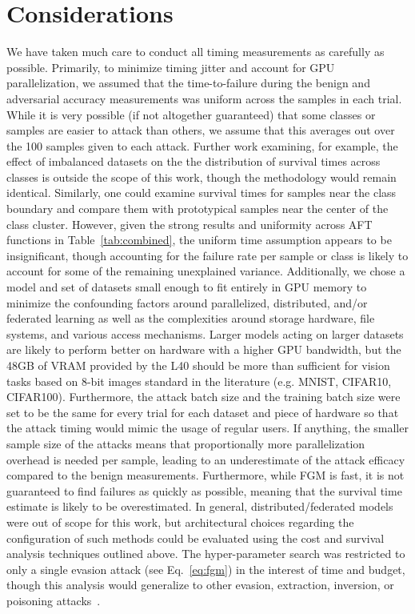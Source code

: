 \documentclass[conference]{IEEEtran}
\begin{document}
{\section{Considerations}
\label{considerations}

We have taken much care to conduct all timing measurements as carefully as possible.
Primarily, to minimize timing jitter and account for GPU parallelization, we assumed that the time-to-failure during the benign and adversarial accuracy measurements was uniform across the samples in each trial. 
While it is very possible (if not altogether guaranteed) that some classes or samples are easier to attack than others, we assume that this averages out over the 100 samples given to each attack. Further work examining, for example, the effect of imbalanced datasets on the the distribution of survival times across classes is outside the scope of this work, though the methodology would remain identical. Similarly, one could examine survival times for samples near the class boundary and compare them with prototypical samples near the center of the class cluster. 
However, given the strong results and uniformity across AFT functions in Table~\ref{tab:combined}, the uniform time assumption appears to be insignificant, though accounting for the failure rate per sample or class is likely to account for some of the remaining unexplained variance. 
Additionally, we chose a model and set of datasets small enough to fit entirely in GPU memory to minimize the confounding factors around parallelized, distributed, and/or federated learning as well as the complexities around storage hardware, file systems, and various access mechanisms. 
Larger models acting on larger datasets are likely to perform better on hardware with a higher GPU bandwidth, but the 48GB of VRAM provided by the L40 should be more than sufficient for vision tasks based on 8-bit images standard in the literature (e.g. MNIST, CIFAR10, CIFAR100). Furthermore, the attack batch size and the training batch size were set to be the same for every trial for each dataset and piece of hardware so that the attack timing would mimic the usage of regular users.
If anything, the smaller sample size of the attacks means that proportionally more parallelization overhead is needed per sample, leading to an underestimate of the attack efficacy compared to the benign measurements. Furthermore, while FGM is fast, it is not guaranteed to find failures as quickly as possible, meaning that the survival time estimate is likely to be overestimated.
In general, distributed/federated models were out of scope for this work, but architectural choices regarding the configuration of such methods could be evaluated using the cost and survival analysis techniques outlined above. 
The hyper-parameter search was restricted to only a single evasion attack (see Eq.~\ref{eq:fgm}) in the interest of time and budget, though this analysis would generalize to other evasion, extraction, inversion, or poisoning attacks~\cite{biggio_evasion_2013,biggio_poisoning_2013,choquette2021label,orekondy2019knockoff}. 


}
\end{document}
